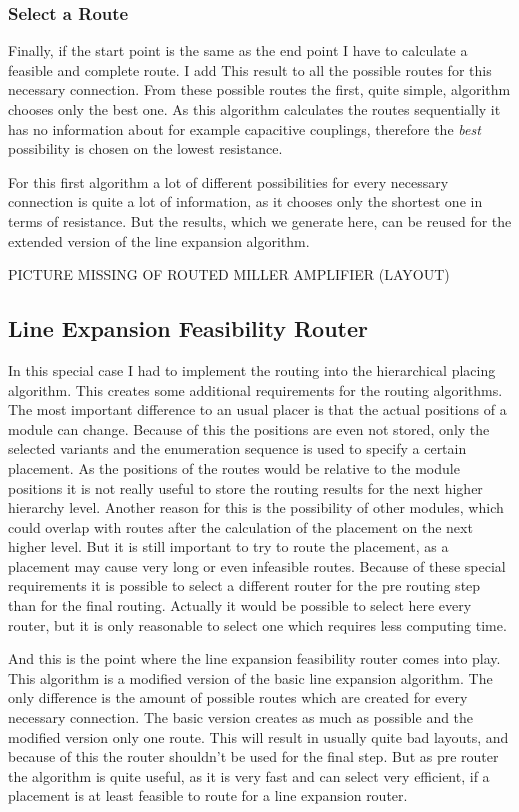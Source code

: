 \subsubsection{Select a Route}
Finally, if the start point is the same as the end point I have to calculate a feasible and complete route. I add This result to all the possible routes for this necessary connection. From these possible routes the first, quite simple, algorithm chooses only the best one. As this algorithm calculates the routes sequentially it has no information about for example capacitive couplings, therefore the \textit{best} possibility is chosen on the lowest resistance.

For this first algorithm a lot of different possibilities for every necessary connection is quite a lot of information, as it chooses only the shortest one in terms of resistance. But the results, which we generate here, can be reused for the extended version of the line expansion algorithm.

PICTURE MISSING OF ROUTED MILLER AMPLIFIER (LAYOUT)

\subsection{Line Expansion Feasibility Router}
In this special case I had to implement the routing into the hierarchical placing algorithm. This creates some additional requirements for the routing algorithms. The most important difference to an usual placer is that the actual positions of a module can change. Because of this the positions are even not stored, only the selected variants and the enumeration sequence is used to specify a certain placement. As the positions of the routes would be relative to the module positions it is not really useful to store the routing results for the next higher hierarchy level. Another reason for this is the possibility of other modules, which could overlap with routes after the calculation of the placement on the next higher level. But it is still important to try to route the placement, as a placement may cause very long or even infeasible routes. Because of these special requirements it is possible to select a different router for the pre routing step than for the final routing. Actually it would be possible to select here every router, but it is only reasonable to select one which requires less computing time.

And this is the point where the line expansion feasibility router comes into play. This algorithm is a modified version of the basic line expansion algorithm. The only difference  is the amount of possible routes which are created for every necessary connection. The basic version creates as much as possible and the modified version only one route. This will result in usually quite bad layouts, and because of this the router shouldn't be used for the final step. But as pre router the algorithm is quite useful, as it is very fast and can select very efficient, if a placement is at least feasible to route for a line expansion router.

